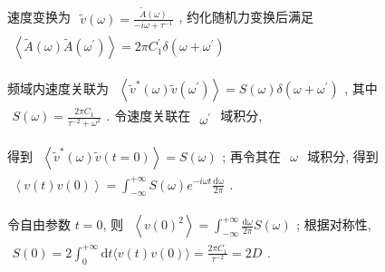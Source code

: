 \documentclass[../../main.tex]{subfiles}
\begin{document}
速度变换为 $\begin{aligned}
    \widetilde{v}(\omega) = \frac{\widetilde{A}(\omega)}{-i\omega + \tau^{-1}}
\end{aligned}$, 约化随机力变换后满足 $\begin{aligned}
    \left\langle \widetilde{A}(\omega)\widetilde{A}\left(\omega^{\prime}\right)\right\rangle = 2\pi C_{1}^{\prime}\delta \left(\omega + \omega^{\prime}\right)
\end{aligned}$

频域内速度关联为 $\begin{aligned}
    \left\langle \widetilde{v}^{*}(\omega)\widetilde{v}\left(\omega^{\prime}\right)\right\rangle = S(\omega)\delta\left(\omega + \omega^{\prime}\right)
\end{aligned}$, 其中 $\begin{aligned}
    S(\omega) = \frac{2\pi C_{1}}{\tau^{-2} + \omega^{2}}
\end{aligned}$. 令速度关联在 $\begin{aligned}
    \omega^{\prime}
\end{aligned}$ 域积分, 

得到 $\begin{aligned}
    \left\langle \widetilde{v}^{*}(\omega)\widetilde{v}\left(t=0\right)\right\rangle = S(\omega)
\end{aligned}$; 再令其在 $\begin{aligned}
    \omega
\end{aligned}$ 域积分, 得到 $\begin{aligned}
    \left\langle v(t)v(0)\right\rangle = \int_{-\infty}^{+\infty} S(\omega)e^{-i\omega t}\frac{\mathrm{d\omega}}{2\pi}
\end{aligned}$. 

令自由参数 $t=0$, 则 $\begin{aligned}
    \left\langle v(0)^{2}\right\rangle = \int_{-\infty}^{+\infty}\frac{\mathrm{d}\omega}{2\pi}S(\omega)
\end{aligned}$; 根据对称性, $\begin{aligned}
    S(0) = 2\int_{0}^{+\infty}\mathrm{d}t\langle v(t)v(0)\rangle = \frac{2\pi C_{1}}{\tau^{-2}} = 2D
\end{aligned}$. 
\end{document}

